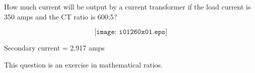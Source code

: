 

How much current will be output by a current transformer if the load current is 350 amps and the CT ratio is 600:5?

$$\texttt{[image: i01260x01.eps]}$$







Secondary current = 2.917 amps







This question is an exercise in mathematical ratios.





